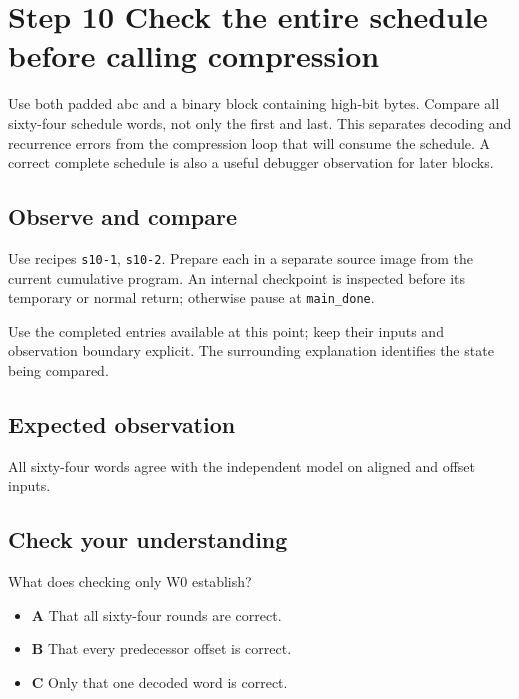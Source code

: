 \section{Step 10 Check the entire schedule before calling compression}\label{sha-s10}

Use both padded abc and a binary block containing high-bit bytes. Compare all sixty-four schedule words, not only the first and last. This separates decoding and recurrence errors from the compression loop that will consume the schedule. A correct complete schedule is also a useful debugger observation for later blocks.

\subsection{Observe and compare}
Use recipes \texttt{s10-1}, \texttt{s10-2}. Prepare each in a separate source image from the current cumulative program. An internal checkpoint is inspected before its temporary or normal return; otherwise pause at \texttt{main\_done}.

Use the completed entries available at this point; keep their inputs and observation boundary explicit. The surrounding explanation identifies the state being compared.

\subsection{Expected observation}
All sixty-four words agree with the independent model on aligned and offset inputs.

\subsection{Check your understanding}
What does checking only W0 establish?

\begin{itemize}
  \item \textbf{A} That all sixty-four rounds are correct.
  \item \textbf{B} That every predecessor offset is correct.
  \item \textbf{C} Only that one decoded word is correct.
\end{itemize}
